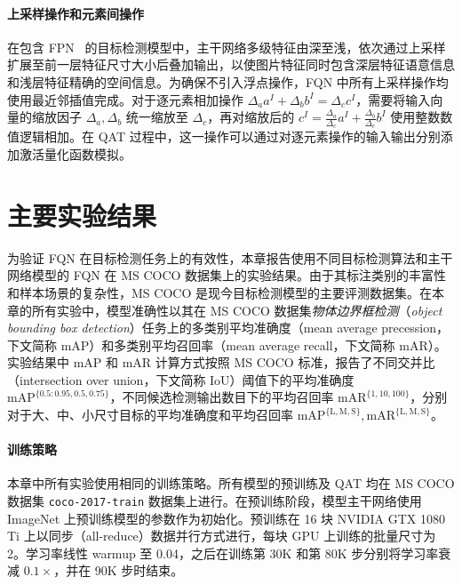 \documentclass[
  fontset = mac,
]{shtthesis}
\providecommand{\mAP}[1]{\mathrm{mAP}^{\mathrm{ #1 }}}
\providecommand{\mAR}[1]{\mathrm{mAR}^{\mathrm{ #1 }}}
\begin{document}
\paragraph{上采样操作和元素间操作}
在包含 FPN~\citep{lin2017feature} 的目标检测模型中，主干网络多级特征由深至浅，依次通过上采样扩展至前一层特征尺寸大小后叠加输出，以使图片特征同时包含深层特征语意信息和浅层特征精确的空间信息。为确保不引入浮点操作，FQN 中所有上采样操作均使用最近邻插值完成。对于逐元素相加操作 $\Delta_a a^I + \Delta_b b^I = \Delta_c c^I$，需要将输入向量的缩放因子 $\Delta_a, \Delta_b$ 统一缩放至 $\Delta_c$，再对缩放后的 $c^I = \frac{\Delta_a}{\Delta_c}a^{I} + \frac{\Delta_b}{\Delta_c}b^{I}$ 使用整数数值逻辑相加。在 QAT 过程中，这一操作可以通过对逐元素操作的输入输出分别添加激活量化函数模拟。
\section{主要实验结果} \label{sec::fqn::experiments}
为验证 FQN 在目标检测任务上的有效性，本章报告使用不同目标检测算法和主干网络模型的 FQN 在 MS COCO 数据集上的实验结果。由于其标注类别的丰富性和样本场景的复杂性，MS COCO 是现今目标检测模型的主要评测数据集。在本章的所有实验中，模型准确性以其在 MS COCO 数据集\emph{物体边界框检测}（\emph{object bounding box detection}）任务上的多类别平均准确度（mean average precession，下文简称 mAP）和多类别平均召回率（mean average recall，下文简称 mAR）。实验结果中 mAP 和 mAR 计算方式按照 MS COCO 标准，报告了不同交并比（intersection over union，下文简称 IoU）阈值下的平均准确度 $\mAP{\{0.5:0.95, 0.5, 0.75\}}$，不同候选检测输出数目下的平均召回率 $\mAR{\{1, 10, 100\}}$，分别对于大、中、小尺寸目标的平均准确度和平均召回率 $\mAP{\{L, M, S\}}, \mAR{\{L, M, S\}}$。

\paragraph{训练策略}
本章中所有实验使用相同的训练策略。所有模型的预训练及 QAT 均在 MS COCO 数据集 \verb|coco-2017-train| 数据集上进行。在预训练阶段，模型主干网络使用 ImageNet 上预训练模型的参数作为初始化。预训练在 16 块 NVIDIA GTX 1080 Ti 上以同步（all-reduce）数据并行方式进行，每块 GPU 上训练的批量尺寸为 2。学习率线性 warmup 至 0.04，之后在训练第 30K 和第 80K 步分别将学习率衰减 $0.1\times$，并在 90K 步时结束。
\end{document}
